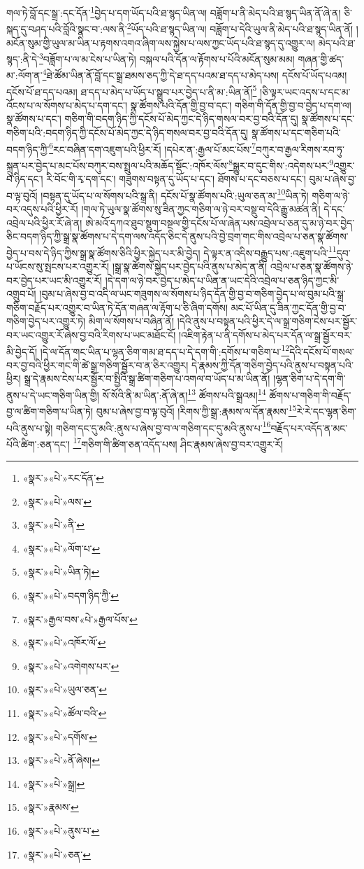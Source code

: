 གལ་ཏེ་བློ་དང་སྒྲ་:དང་དོན་\footnote{«སྣར་»«པེ་»རང་དོན་}བྱེད་པ་དག་ཡོད་པའི་ཐ་སྙད་ཡིན་ལ། བཟློག་པ་ནི་མེད་པའི་ཐ་སྙད་ཡིན་ནོ་ཞེ་ན། ཅི་སྐད་དུ་བཤད་པའི་བློའི་སྣང་བ་:ལས་ནི་\footnote{«སྣར་»«པེ་»ལས་}ཡོད་པའི་ཐ་སྙད་ཡིན་ལ། བཟློག་པ་དེའི་ཡུལ་ནི་མེད་པའི་ཐ་སྙད་ཡིན་ནོ། །མངོན་སུམ་གྱི་ཡུལ་མ་ཡིན་པ་རྟགས་འགའ་ཞིག་ལས་སྐྱེས་པ་ལས་ཀྱང་ཡོད་པའི་ཐ་སྙད་དུ་འགྱུར་ལ། མེད་པའི་ཐ་སྙད་:ནི་དེ་\footnote{«སྣར་»«པེ་»ནི་}བཟློག་པ་ལ་མ་ངེས་པ་ཡིན་ཏེ། བསྐལ་པའི་དོན་ལ་རྟོགས་པ་པོའི་མངོན་སུམ་མམ། གཞན་གྱི་ཚད་མ་:ལོག་ན་\footnote{«སྣར་»«པེ་»ལོག་པ་}ཐེ་ཚོམ་ཡིན་ནོ་བློ་དང་སྒྲ་ཐམས་ཅད་ཀྱི་དེ་ཐ་དད་པའམ་ཐ་དད་པ་མེད་པས། དངོས་པོ་ཡོད་པའམ། དངོས་པོ་ཐ་དད་པའམ། ཐ་དད་པ་མེད་པ་ཡོད་པ་སྒྲུབ་པར་བྱེད་པ་ནི་མ་:ཡིན་ནོ།\footnote{«སྣར་»«པེ་»ཡིན་ཏེ།} །ཅི་ལྟར་ཡང་འདས་པ་དང་མ་འོངས་པ་ལ་སོགས་པ་མེད་པ་དག་དང་། སྣ་ཚོགས་པའི་དོན་གྱི་བྱ་བ་དང་། གཅིག་གི་དོན་གྱི་བྱ་བ་བྱེད་པ་དག་ལ། སྣ་ཚོགས་པ་དང་། གཅིག་གི་བདག་ཉིད་ཀྱི་དངོས་པོ་མེད་ཀྱང་དེ་ཉིད་གསལ་བར་བྱ་བའི་དོན་དུ། སྣ་ཚོགས་པ་དང་གཅིག་པའི་:བདག་ཉིད་ཀྱི་དངོས་པོ་མེད་ཀྱང་དེ་ཉིད་གསལ་བར་བྱ་བའི་དོན་དུ། སྣ་ཚོགས་པ་དང་གཅིག་པའི་བདག་ཉིད་ཀྱི་\footnote{«སྣར་»«པེ་»བདག་ཉིད་ཀྱི་}རང་བཞིན་དག་འཇུག་པའི་ཕྱིར་རོ། །དཔེར་ན་:རྒྱལ་པོ་མང་པོས་\footnote{«སྣར་»རྒྱལ་བས་«པེ་»རྒྱལ་པོས་}བཀུར་བ་རྒྱལ་རིགས་རབ་ཏུ་སྐྲུན་པར་བྱེད་པ་མང་པོས་བཀུར་བས་སྤྲུལ་པའི་མཆོད་སྡོང་:འཁོར་ལོས་\footnote{«སྣར་»«པེ་»འཁོར་ལོ་}སྒྱུར་བ་དུང་གིས་:འདེགས་པར་\footnote{«སྣར་»«པེ་»འགེགས་པར་}འགྱུར་བ་ཉིད་དང་། རི་བོང་གི་རྭ་དག་དང་། གཟུགས་བསྟན་དུ་ཡོད་པ་དང་། ཐོགས་པ་དང་བཅས་པ་དང་། བུམ་པ་ཞེས་བྱ་བ་ལྟ་བུའོ། །བསྟན་དུ་ཡོད་པ་ལ་སོགས་པའི་སྒྲ་ནི། དངོས་པོ་སྣ་ཚོགས་པའི་:ཡུལ་ཅན་མ་\footnote{«སྣར་»«པེ་»ཡུལ་ཅན་}ཡིན་ཏེ། གཅིག་ལ་ཉེ་བར་འདུས་པའི་ཕྱིར་རོ། །གལ་ཏེ་ཡུལ་སྣ་ཚོགས་སུ་ཟིན་ཀྱང་གཅིག་ལ་ཉེ་བར་བསྡུ་བ་དེའི་རྒྱུ་མཚན་ནི། དེ་དང་འབྲེལ་པའི་ཕྱིར་རོ་ཞེ་ན། ཨེ་མའོ་དཀའ་ཐུབ་སྡུག་བསྔལ་གྱི་དངོས་པོ་ལ་ཞེན་པས་འབྲེལ་པ་ཅན་དུ་མ་ཉེ་བར་བྱེད་ཅིང་བདག་ཉིད་ཀྱི་སྒྲ་སྣ་ཚོགས་པ་དེ་དག་ལས་འདོད་ཅིང་དེ་ནུས་པའི་བྱེ་བྲག་གང་གིས་འབྲེལ་པ་ཅན་སྣ་ཚོགས་བྱེད་པ་བས་དེ་ཉིད་ཀྱིས་སྒྲ་སྣ་ཚོགས་ཅིའི་ཕྱིར་སྐྱེད་པར་མི་བྱེད། དེ་ལྟར་ན་འདིས་བརྒྱུད་པས་:འཇུག་པའི་\footnote{«སྣར་»«པེ་»ཚོལ་བའི་}དུབ་པ་ཡོངས་སུ་སྤངས་པར་འགྱུར་རོ། །སྒྲ་སྣ་ཚོགས་སྐྱེད་པར་བྱེད་པའི་ནུས་པ་མེད་ན་ནི། འབྲེལ་པ་ཅན་སྣ་ཚོགས་ཉེ་བར་བྱེད་པར་ཡང་མི་འགྱུར་རོ། །དེ་དག་ལ་ཉེ་བར་བྱེད་པ་མེད་པ་ཡིན་ན་ཡང་དེའི་འབྲེལ་པ་ཅན་ཉིད་ཀྱང་མི་འགྲུབ་པོ། །བུམ་པ་ཞེས་བྱ་བ་འདི་ལ་ཡང་གཟུགས་ལ་སོགས་པ་ཉིད་དོན་གྱི་བྱ་བ་གཅིག་བྱེད་པ་ལ་བུམ་པའི་སྒྲ་གཅིག་བརྗོད་པར་འགྱུར་བ་ཡིན་ཏེ་དོན་གཞན་ལ་རྟོག་པ་ཅི་ཞིག་དགོས། མང་པོ་ཡིན་དུ་ཟིན་ཀྱང་དོན་གྱི་བྱ་བ་གཅིག་བྱེད་པར་འགྱུར་ཏེ། མིག་ལ་སོགས་པ་བཞིན་ནོ། །དེའི་ནུས་པ་བསྟན་པའི་ཕྱིར་དེ་ལ་སྒྲ་གཅིག་ངེས་པར་སྦྱོར་བར་ཡང་འགྱུར་རོ་ཞེས་བྱ་བའི་རིགས་པ་ཡང་མཐོང་ངོ། །འཇིག་རྟེན་པ་ནི་དགོས་པ་མེད་པར་དོན་ལ་སྒྲ་སྦྱོར་བར་མི་བྱེད་དོ། །དེ་ལ་དོན་གང་ཡིན་པ་ལྷན་ཅིག་གམ་ཐ་དད་པ་དེ་དག་གི་:དགོས་པ་གཅིག་པ་\footnote{«སྣར་»«པེ་»དགོས་}དེའི་དངོས་པོ་གསལ་བར་བྱ་བའི་ཕྱིར་གང་གི་ཚེ་སྒྲ་གཅིག་སྦྱོར་བ་ན་ཅིར་འགྱུར། དེ་རྣམས་ཀྱི་དོན་གཅིག་བྱེད་པའི་ནུས་པ་བསྟན་པའི་ཕྱིར། སྒྲ་དེ་རྣམས་ངེས་པར་སྦྱོར་བ་སྤྱིའི་སྒྲ་ཚིག་གཅིག་པ་འགལ་བ་ཡོད་པ་མ་ཡིན་ནོ། །ལྷན་ཅིག་པ་དེ་དག་གི་ནུས་པ་དེ་ཡང་གཅིག་ཡིན་གྱི། སོ་སོའི་ནི་མ་ཡིན་:ནོ་ཞེ་ན།\footnote{«སྣར་»«པེ་»ནོ་ཞེས།} ཚོགས་པའི་སྒྲའམ།\footnote{«སྣར་»«པེ་»སྒྲ།} ཚོགས་པ་གཅིག་གི་བརྗོད་བྱ་ལ་ཚིག་གཅིག་པ་ཡིན་ཏེ། བུམ་པ་ཞེས་བྱ་བ་ལྟ་བུའོ། །རིགས་ཀྱི་སྒྲ་:རྣམས་ལ་དོན་རྣམས་\footnote{«སྣར་»རྣམས་}རེ་རེ་དང་ལྷན་ཅིག་པའི་ནུས་པ་སྟེ། གཅིག་དང་དུ་མའི་:ནུས་པ་ཞེས་བྱ་བ་ལ་གཅིག་དང་དུ་མའི་ནུས་པ་\footnote{«སྣར་»«པེ་»ནུས་པ་}བརྗོད་པར་འདོད་ན་མང་པོའི་ཚིག་:ཅན་དང་། \footnote{«སྣར་»«པེ་»ཅན་}གཅིག་གི་ཚིག་ཅན་འདོད་པས། ཤིང་རྣམས་ཞེས་བྱ་བར་འགྱུར་རོ། 